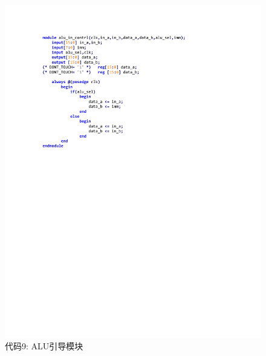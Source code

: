 \documentclass[titlepage, 11pt]{article}
\begin{document}
			\begin{figure}[H]
				\centering
				\includegraphics[scale=1]{31.pdf}
				\caption*{代码9: ALU引导模块}
			\end{figure}
\end{document}
